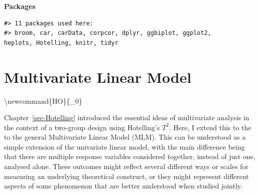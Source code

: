 \documentclass[
  letterpaper,
  10pt,
  krantz2]{krantz}
\begin{document}
{\textbf{Packages}

\begin{verbatim}
#> 11 packages used here:
#> broom, car, carData, corpcor, dplyr, ggbiplot, ggplot2,
heplots, Hotelling, knitr, tidyr
\end{verbatim}


\chapter{Multivariate Linear Model}\label{sec-mlm-review}

\renewcommand*{\vec}[1]{\mathbf{#1}}
\newcommand{\trans}{^\mathsf{T}}
\newcommand*{\mat}[1]{\mathbf{#1}}
\newcommand*{\diag}[1]{\mathrm{diag}\, #1}

\renewcommand*{\det}[1]{\mathrm{det}(#1)}
\newcommand*{\rank}[1]{\mathrm{rank} (\mathbf{#1})}
\newcommand*{\trace}[1]{\mathrm{tr} (\mathbf{#1})}
\newcommand*{\dev}[1]{(#1 - \bar{#1})}
\newcommand*{\inv}[1]{\mat{#1}^{-1}}
\newcommand*{\half}[1]{\mat{#1}^{1/2}}
\newcommand*{\invhalf}[1]{\mat{#1}^{-1/2}}
\newcommand*{\nvec}[2]{{#1}_{1}, {#1}_{2},\ldots,{#1}_{#2}}
\newcommand*{\Beta}{\boldsymbol{B}}
\newcommand*{\Epsilon}{\boldsymbol{\Large\varepsilon}}
\newcommand*{\period}{\:\: .}
\newcommand*{\comma}{\:\: ,}
\newcommand*{\given}{\, | \,}
\newcommand*{\Real}[1]{\mathbb{R}^{#1}}
\newcommand*{\degree}[1]{{#1}^{\circ}}

\newcommand{\sizedmat}[2]{\mathord{\mathop{\mat{#1}}\limits_{#2}}}

\renewcommand*{\H}{\mathbf{H}}               
\newcommand*{\E}{\mathbf{E}}
\newcommand*{\widebar}[1]{\overline{#1}}

\newcommand{\Var}{\mathsf{Var}}
\newcommand{\Cov}{\mathsf{Cov}}

\textbackslash newcommand\{HO\}\{\_0\}

\newcommand*{\V}{\mathcal{V}}

\newcommand{\pkg}[1]{\textsf{#1}}
\newcommand{\Rpackage}[1]{\pkg{#1} package}

Chapter~\ref{sec-Hotelling} introduced the essential ideas of
multivariate analysis in the context of a two-group design using
Hotelling's \(T^2\). Here, I extend this to the to the general
Multivariate Linear Model (MLM). This can be understood as a simple
extension of the univariate linear model, with the main difference being
that there are multiple response variables considered together, instead
of just one, analysed alone. These outcomes might reflect several
different ways or scales for measuring an underlying theoretical
construct, or they might represent different aspects of some phenomenon
that are better understood when studied jointly.

}
\end{document}
